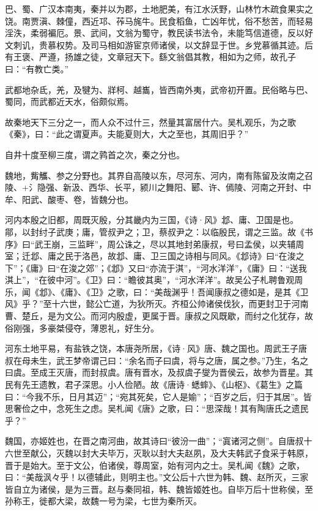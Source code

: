 \documentclass[12pt,UTF8]{ctexbook}
\begin{document}
巴、蜀、广汉本南夷，秦并以为郡，土地肥美，有江水沃野，山林竹木疏食果实之饶。南贾滇、棘僮，西近邛、莋马旄牛。民食稻鱼，亡凶年忧，俗不愁苦，而轻易淫泆，柔弱褊厄。景、武间，文翁为蜀守，教民读书法令，未能笃信道德，反以好文刺讥，贵慕权势。及司马相如游宦京师诸侯，以文辞显于世。乡党慕循其迹。后有王褒、严遵，扬雄之徒，文章冠天下。繇文翁倡其教，相如为之师，故孔子曰：“有教亡类。”



武都地杂氐，羌，及犍为、牂柯、越巂，皆西南外夷，武帝初开置。民俗略与巴、蜀同，而武都近天水，俗颇似焉。



故秦地天下三分之一，而人众不过什三，然量其富居什六。吴札观乐，为之歌《秦》，曰：“此之谓夏声。夫能夏则大，大之至也，其周旧乎？”



自井十度至柳三度，谓之鹑首之次，秦之分也。



魏地，觜觿、参之分野也。其界自高陵以东，尽河东、河内，南有陈留及汝南之召陵、+氵隐强、新汲、西华、长平，颍川之舞阳、郾、许、傿陵、河南之开封、中牟、阳武、酸枣、卷，皆魏分也。



河内本殷之旧都，周既灭殷，分其畿内为三国，《诗·风》邶、庸、卫国是也。鄁，以封纣子武庚；庸，管叔尹之；卫，蔡叔尹之：以临殷民，谓之三监。故《书序》曰“武王崩，三监畔”，周公诛之，尽以其地封弟康叔，号曰孟侯，以夹辅周室；迁邶、庸之民于洛邑，故邶、庸、卫三国之诗相与同风。《邶诗》曰“在浚之下”；《庸》曰“在浚之郊”；《邶》又曰“亦流于淇”，“河水洋洋”，《庸》曰：“送我淇上”，“在彼中河”。《卫》曰：“瞻彼其奥”，“河水洋洋”。故吴公子札聘鲁观周乐，闻《邶》、《庸》、《卫》之歌，曰：“美哉渊乎！吾闻康叔之德如是，是其《卫风》乎？”至十六世，懿公亡道，为狄所灭。齐桓公帅诸侯伐狄，而更封卫于河南曹、楚丘，是为文公。而河内殷虚，更属于晋。康叔之风既歇，而纣之化犹存，故俗刚强，多豪桀侵夺，薄恩礼，好生分。



河东土地平易，有盐铁之饶，本唐尧所居，《诗·风》唐、魏之国也。周武王子唐叔在母未生，武王梦帝谓己曰：“余名而子曰虞，将与之唐，属之参。”乃生，名之曰虞。至成王灭唐，而封叔虞。唐有晋水，及叔虞子燮为晋侯云，故参为晋星。其民有先王遗教，君子深思。小人俭陋。故《唐诗·蟋蟀》、《山枢》、《葛生》之篇曰：“今我不乐，日月其迈”；“宛其死矣，它人是媮”；“百岁之后，归于其居”。皆思奢俭之中，念死生之虑。吴札闻《唐》之歌，曰：“思深哉！其有陶唐氏之遗民乎？”



魏国，亦姬姓也，在晋之南河曲，故其诗曰“彼汾一曲”；“寘诸河之侧”。自唐叔十六世至献公，灭魏以封大夫毕万，灭耿以封大夫赵夙，及大夫韩武子食采于韩原，晋于是始大。至于文公，伯诸侯，尊周室，始有河内之士。吴札闻《魏》之歌，曰：“美哉沨々乎！以德辅此，则明主也。”文公后十六世为韩、魏、赵所灭，三家皆自立为诸侯，是为三晋。赵与秦同祖，韩、魏皆姬姓也。自毕万后十世称侯，至孙称王，徙都大梁，故魏一号为梁，七世为秦所灭。
\end{document}
